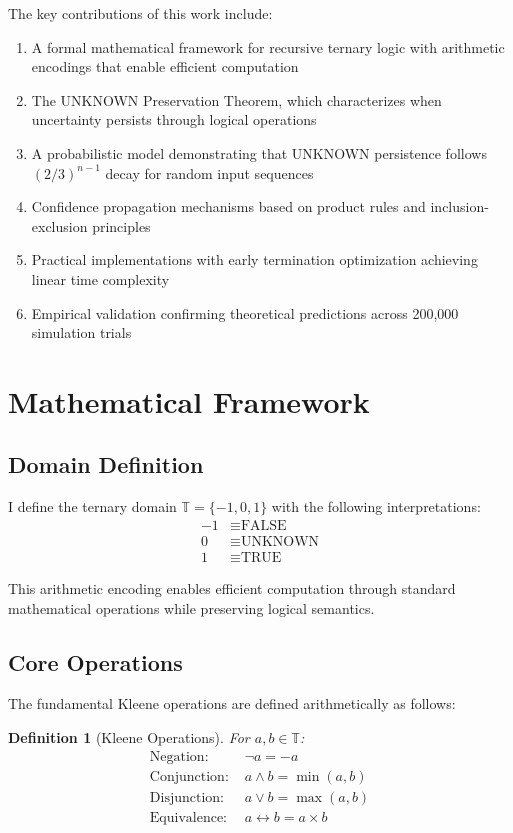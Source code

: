 \documentclass[11pt,a4paper]{article}
\newtheorem{definition}{Definition}
\begin{document}
The key contributions of this work include:

\begin{enumerate}
\item A formal mathematical framework for recursive ternary logic with arithmetic encodings that enable efficient computation
\item The UNKNOWN Preservation Theorem, which characterizes when uncertainty persists through logical operations
\item A probabilistic model demonstrating that UNKNOWN persistence follows $(2/3)^{n-1}$ decay for random input sequences
\item Confidence propagation mechanisms based on product rules and inclusion-exclusion principles
\item Practical implementations with early termination optimization achieving linear time complexity
\item Empirical validation confirming theoretical predictions across 200,000 simulation trials
\end{enumerate}

\section{Mathematical Framework}

\subsection{Domain Definition}

I define the ternary domain $\mathbb{T} = \{-1, 0, 1\}$ with the following interpretations:
\begin{align}
-1 &\equiv \text{FALSE} \\
0 &\equiv \text{UNKNOWN} \\
1 &\equiv \text{TRUE}
\end{align}

This arithmetic encoding enables efficient computation through standard mathematical operations while preserving logical semantics.

\subsection{Core Operations}

The fundamental Kleene operations are defined arithmetically as follows:

\begin{definition}[Kleene Operations]
For $a, b \in \mathbb{T}$:
\begin{align}
\text{Negation: } &\neg a = -a \\
\text{Conjunction: } &a \land b = \min(a, b) \\
\text{Disjunction: } &a \lor b = \max(a, b) \\
\text{Equivalence: } &a \leftrightarrow b = a \times b
\end{align}
\end{definition}
\end{document}
